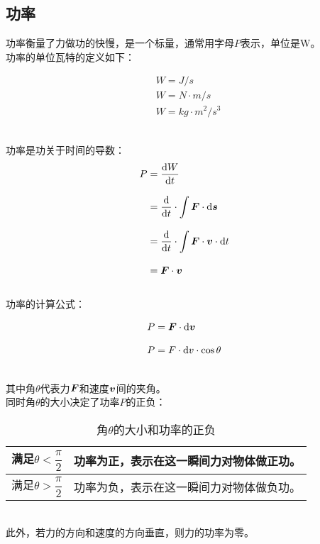 \documentclass[UTF8]{ctexart}
\newcommand*{\veb}[1]{\vb*{#1}}
\newcommand*{\dif}{\mathop{}\!\mathrm{d}}
\begin{document}
\newpage

\subsection{功率}
    功率衡量了力做功的快慢，是一个标量，通常用字母$P$表示，单位是\si{W}。\\[3mm]
    功率的单位瓦特的定义如下：
    \begin{large}
        \begin{align*}
            &\si{W=J/s}\\[3mm]
            &\si{W=N\cdot m/s}\\[3mm]
            &\si{W=kg\cdot m^2/s^3}
        \end{align*}
    \end{large}\\
    功率是功关于时间的导数：
    \setcounter{equation}{0}
    \begin{align}
        P
        &=\frac{\dif W}{\dif t}\\[3mm]
        &=\frac{\dif}{\dif t}\cdot\int\veb{F}\cdot\dif\veb{s}\\[3mm]
        &=\frac{\dif}{\dif t}\cdot\int\veb{F}\cdot\veb{v}\cdot\dif t\\[3mm]
        &=\veb{F}\cdot\veb{v}
    \end{align}\\
    功率的计算公式：
    \begin{large}
        \begin{align*}
            &P=\veb{F}\cdot\dif\veb{v}\\[3mm]
            &P=F\cdot\dif v\cdot\cos{\theta}
        \end{align*}
    \end{large}\\
    其中角$\theta$代表力$\veb{F}$和速度$\veb{v}$间的夹角。\\[5mm]
    同时角$\theta$的大小决定了功率$P$的正负：\vspace{8pt}
    \begin{table}[h]
        \begin{center}
            \begin{tabular}{p{80pt}|p{220pt}}
                \hline
                满足$\theta<\dfrac{\pi}{2}$\vphantom{$\Biggl(\Biggr)$}&功率为正，表示在这一瞬间力对物体做正功。\\ \hline
                满足$\theta>\dfrac{\pi}{2}$\vphantom{$\Biggl(\Biggr)$}&功率为负，表示在这一瞬间力对物体做负功。\\ \hline
            \end{tabular}
            \caption{角$\theta$的大小和功率的正负}
        \end{center}
    \end{table}\\
    此外，若力的方向和速度的方向垂直，则力的功率为零。
\end{document}
